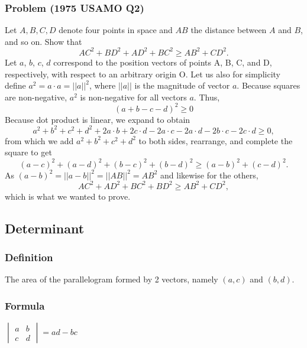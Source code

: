 \documentclass{article}
\begin{document}
\subsubsection{Problem (1975 USAMO Q2)}
Let $A,B,C,D$ denote four points in space and $AB$ the distance between $A$ and $B$, and so on. Show that\[AC^2+BD^2+AD^2+BC^2\ge AB^2+CD^2.\]
Let $a$, $b$, $c$, $d$ correspond to the position vectors of points A, B, C, and D, respectively, with respect to an arbitrary origin O. Let us also for simplicity define $a^2 = a \cdot a = ||a||^2$, where $||a||$ is the magnitude of vector $a$. Because squares are non-negative, $a^2$ is non-negative for all vectors $a$. Thus,\[(a + b - c - d)^2 \ge 0\]Because dot product is linear, we expand to obtain\[a^2 + b^2 + c^2 + d^2 + 2a \cdot b + 2 c \cdot d - 2 a \cdot c - 2 a \cdot d - 2 b \cdot c - 2 c \cdot d \ge 0,\]from which we add $a^2 + b^2 + c^2 + d^2$ to both sides, rearrange, and complete the square to get\[(a-c)^2 + (a-d)^2 + (b-c)^2 + (b-d)^2 \ge (a-b)^2 + (c-d)^2.\]As $(a-b)^2 = ||a-b||^2 = ||AB||^2 = AB^2$ and likewise for the others,\[AC^2 + AD^2 + BC^2 + BD^2 \ge AB^2 + CD^2,\]which is what we wanted to prove.

\pagebreak

\subsection{Determinant}
\subsubsection{Definition}
The area of the parallelogram formed by 2 vectors, namely $(a,c)$ and $(b,d)$.
\subsubsection{Formula}

$
\begin{vmatrix}
    a & b\\
    c & d
\end{vmatrix}
= ad-bc
$
\end{document}
